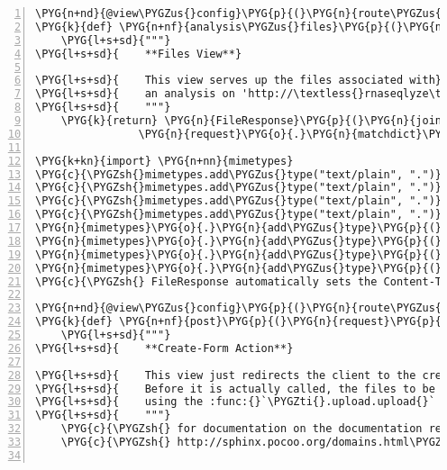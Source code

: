 \begin{Verbatim}[commandchars=\\\{\},numbers=left,firstnumber=1,stepnumber=5]
\PYG{n+nd}{@view\PYGZus{}config}\PYG{p}{(}\PYG{n}{route\PYGZus{}name}\PYG{o}{=}\PYG{l+s}{'}\PYG{l+s}{analysis\PYGZus{}files}\PYG{l+s}{'}\PYG{p}{)}
\PYG{k}{def} \PYG{n+nf}{analysis\PYGZus{}files}\PYG{p}{(}\PYG{n}{request}\PYG{p}{)}\PYG{p}{:}
    \PYG{l+s+sd}{"""}
\PYG{l+s+sd}{    **Files View**}

\PYG{l+s+sd}{    This view serves up the files associated with}
\PYG{l+s+sd}{    an analysis on 'http://\textless{}rnaseqlyze\textgreater{}/analysis/\PYGZob{}id\PYGZcb{}/files'.}
\PYG{l+s+sd}{    """}
    \PYG{k}{return} \PYG{n}{FileResponse}\PYG{p}{(}\PYG{n}{join}\PYG{p}{(}\PYG{n}{rnaseqlyze}\PYG{o}{.}\PYG{n}{analyses\PYGZus{}path}\PYG{p}{,}
                \PYG{n}{request}\PYG{o}{.}\PYG{n}{matchdict}\PYG{p}{[}\PYG{l+s}{'}\PYG{l+s}{id}\PYG{l+s}{'}\PYG{p}{]}\PYG{p}{,} \PYG{o}{*}\PYG{n}{request}\PYG{o}{.}\PYG{n}{subpath}\PYG{p}{)}\PYG{p}{)}

\PYG{k+kn}{import} \PYG{n+nn}{mimetypes}
\PYG{c}{\PYGZsh{}mimetypes.add\PYGZus{}type("text/plain", ".")}
\PYG{c}{\PYGZsh{}mimetypes.add\PYGZus{}type("text/plain", ".")}
\PYG{c}{\PYGZsh{}mimetypes.add\PYGZus{}type("text/plain", ".")}
\PYG{c}{\PYGZsh{}mimetypes.add\PYGZus{}type("text/plain", ".")}
\PYG{n}{mimetypes}\PYG{o}{.}\PYG{n}{add\PYGZus{}type}\PYG{p}{(}\PYG{l+s}{"}\PYG{l+s}{text/plain}\PYG{l+s}{"}\PYG{p}{,} \PYG{l+s}{"}\PYG{l+s}{.gb}\PYG{l+s}{"}\PYG{p}{)}
\PYG{n}{mimetypes}\PYG{o}{.}\PYG{n}{add\PYGZus{}type}\PYG{p}{(}\PYG{l+s}{"}\PYG{l+s}{text/plain}\PYG{l+s}{"}\PYG{p}{,} \PYG{l+s}{"}\PYG{l+s}{.log}\PYG{l+s}{"}\PYG{p}{)}
\PYG{n}{mimetypes}\PYG{o}{.}\PYG{n}{add\PYGZus{}type}\PYG{p}{(}\PYG{l+s}{"}\PYG{l+s}{text/plain}\PYG{l+s}{"}\PYG{p}{,} \PYG{l+s}{"}\PYG{l+s}{.log0}\PYG{l+s}{"}\PYG{p}{)}
\PYG{n}{mimetypes}\PYG{o}{.}\PYG{n}{add\PYGZus{}type}\PYG{p}{(}\PYG{l+s}{"}\PYG{l+s}{text/plain}\PYG{l+s}{"}\PYG{p}{,} \PYG{l+s}{"}\PYG{l+s}{.info}\PYG{l+s}{"}\PYG{p}{)}
\PYG{c}{\PYGZsh{} FileResponse automatically sets the Content-Type header based on this}

\PYG{n+nd}{@view\PYGZus{}config}\PYG{p}{(}\PYG{n}{route\PYGZus{}name}\PYG{o}{=}\PYG{l+s}{'}\PYG{l+s}{analyses}\PYG{l+s}{'}\PYG{p}{,} \PYG{n}{request\PYGZus{}method}\PYG{o}{=}\PYG{l+s}{'}\PYG{l+s}{POST}\PYG{l+s}{'}\PYG{p}{)}
\PYG{k}{def} \PYG{n+nf}{post}\PYG{p}{(}\PYG{n}{request}\PYG{p}{)}\PYG{p}{:}
    \PYG{l+s+sd}{"""}
\PYG{l+s+sd}{    **Create-Form Action**}

\PYG{l+s+sd}{    This view just redirects the client to the created analysis page.}
\PYG{l+s+sd}{    Before it is actually called, the files to be analyzed, are uploaded}
\PYG{l+s+sd}{    using the :func:{}`\PYGZti{}.upload.upload{}` view callable.}
\PYG{l+s+sd}{    """}
    \PYG{c}{\PYGZsh{} for documentation on the documentation reference syntax, see}
    \PYG{c}{\PYGZsh{} http://sphinx.pocoo.org/domains.html\PYGZsh{}cross-referencing-python-objects}


\end{Verbatim}
